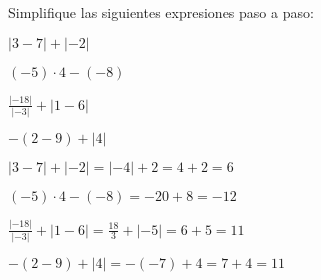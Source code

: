 \begin{exercise}
\problem Simplifique las siguientes expresiones paso a paso:

\begin{exerciselist}
    \item $|3 - 7| + |-2|$
    \item $(-5) \cdot 4 - (-8)$
    \item $\frac{|-18|}{|-3|} + |1 - 6|$
    \item $-(2 - 9) + |4|$
\end{exerciselist}

\begin{solucion}
\begin{exerciselist}
    \item $|3 - 7| + |-2| = |-4| + 2 = 4 + 2 = 6$
    \item $(-5) \cdot 4 - (-8) = -20 + 8 = -12$
    \item $\frac{|-18|}{|-3|} + |1 - 6| = \frac{18}{3} + |-5| = 6 + 5 = 11$
    \item $-(2 - 9) + |4| = -(-7) + 4 = 7 + 4 = 11$
\end{exerciselist}
\end{solucion}
\end{exercise}

